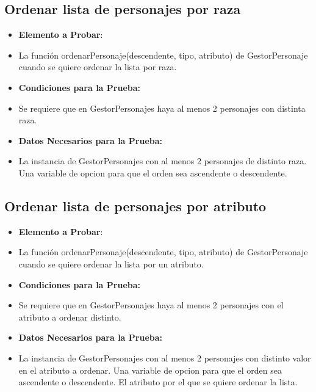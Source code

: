 \documentclass{article}
\begin{document}
\subsection{Ordenar lista de personajes por raza}
\renewcommand{\labelitemi}{}
\begin{itemize}

\item \textbf{Elemento a Probar}: 

\item La función ordenarPersonaje(descendente, tipo, atributo) de GestorPersonaje cuando se quiere ordenar la lista por raza.

\item \textbf{Condiciones para la Prueba:}

\item Se requiere que en GestorPersonajes haya al menos 2 personajes con distinta raza.    

\item \textbf{Datos Necesarios para la Prueba:}

\item La instancia de GestorPersonajes con al menos 2 personajes de distinto raza.
Una variable de opcion para que el orden sea ascendente o descendente.

\end{itemize}

\subsection{Ordenar lista de personajes por atributo}
\renewcommand{\labelitemi}{}
\begin{itemize}

\item \textbf{Elemento a Probar}: 

\item La función ordenarPersonaje(descendente, tipo, atributo) de GestorPersonaje cuando se quiere ordenar la lista por un atributo.

\item \textbf{Condiciones para la Prueba:}

\item Se requiere que en GestorPersonajes haya al menos 2 personajes con el atributo a ordenar distinto.

\item \textbf{Datos Necesarios para la Prueba:}

\item La instancia de GestorPersonajes con al menos 2 personajes con distinto valor en el atributo a ordenar. Una variable de opcion para que el orden sea ascendente o descendente. El atributo por el que se quiere ordenar la lista.

\end{itemize}
\end{document}

